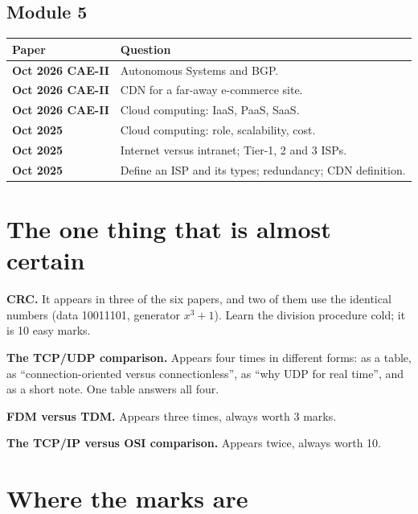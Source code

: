 \documentclass[11pt,a4paper]{article}
\begin{document}
\subsection{Module 5}

\begin{center}\small
\begin{tabularx}{\textwidth}{>{\bfseries}p{} X}
\toprule Paper & Question\\
\midrule
Oct 2026 CAE-II & Autonomous Systems and BGP.\\
Oct 2026 CAE-II & CDN for a far-away e-commerce site.\\
Oct 2026 CAE-II & Cloud computing: IaaS, PaaS, SaaS.\\
Oct 2025 & Cloud computing: role, scalability, cost.\\
Oct 2025 & Internet versus intranet; Tier-1, 2 and 3 ISPs.\\
Oct 2025 & Define an ISP and its types; redundancy; CDN definition.\\
\bottomrule
\end{tabularx}
\end{center}

\section{The one thing that is almost certain}

\textbf{CRC.} It appears in three of the six papers, and two of them use the identical numbers (data 10011101, generator $x^3+1$). Learn the division procedure cold; it is 10 easy marks.

\textbf{The TCP/UDP comparison.} Appears four times in different forms: as a table, as ``connection-oriented versus connectionless'', as ``why UDP for real time'', and as a short note. One table answers all four.

\textbf{FDM versus TDM.} Appears three times, always worth 3 marks.

\textbf{The TCP/IP versus OSI comparison.} Appears twice, always worth 10.

\section{Where the marks are}
\end{document}
